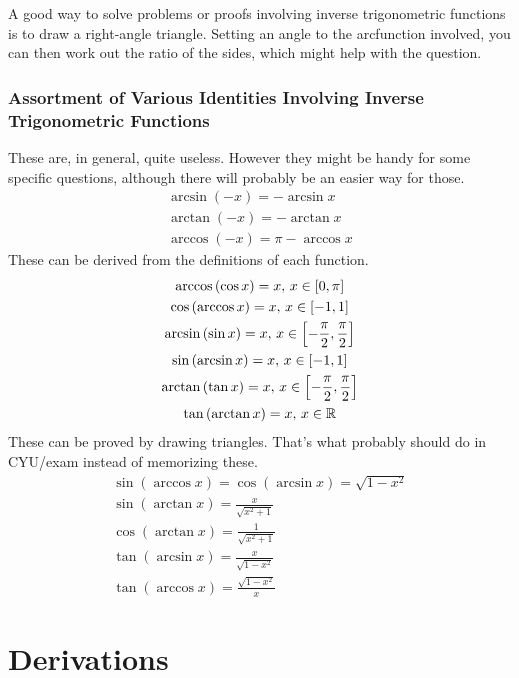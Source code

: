 \documentclass{article}
\begin{document}
A good way to solve problems or proofs involving inverse
trigonometric functions is to draw a right-angle triangle. Setting
an angle to the arcfunction involved, you can then work out the
ratio of the sides, which might help with the question.

\subsubsection{Assortment of Various Identities Involving Inverse
Trigonometric Functions}
These are, in general, quite useless. However they might be handy
for some specific questions, although there will probably be an
easier way for those.
\begin{gather*}
	\arcsin\left(-x\right)=-\arcsin x \\
	\arctan\left(-x\right)=-\arctan x \\
	\arccos\left(-x\right)=\pi-\arccos x
\end{gather*}
These can be derived from the definitions of each function.
\begin{gather*}
	\arccos\left(\cos x\right)=x,\,x\in\interval[scaled]{0}{\pi} \\
	\cos\left(\arccos x\right)=x,\,x\in\interval[scaled]{-1}{1} \\
	\arcsin\left(\sin x\right)=x,\,x\in\interval[scaled]
		{-\frac{\pi}{2}}{\frac{\pi}{2}} \\
	\sin\left(\arcsin x\right)=x,\,x\in\interval[scaled]{-1}{1} \\
	\arctan\left(\tan x\right)=x,\,x\in\interval[scaled]
		{-\frac{\pi}{2}}{\frac{\pi}{2}} \\
	\tan\left(\arctan x\right)=x,\,x\in\mathbb{R}
\end{gather*}
These can be proved by drawing triangles. That's what probably
should do in CYU/exam instead of memorizing these.
\begin{gather*}
	\sin\left(\arccos x\right)=
	\cos\left(\arcsin x\right)=\sqrt{1-x^2} \\
	\sin\left(\arctan x\right)=\frac{x}{\sqrt{x^2+1}} \\
	\cos\left(\arctan x\right)=\frac{1}{\sqrt{x^2+1}} \\
	\tan\left(\arcsin x\right)=\frac{x}{\sqrt{1-x^2}} \\
	\tan\left(\arccos x\right)=\frac{\sqrt{1-x^2}}{x}
\end{gather*}


\newpage
\section{Derivations}
\end{document}

